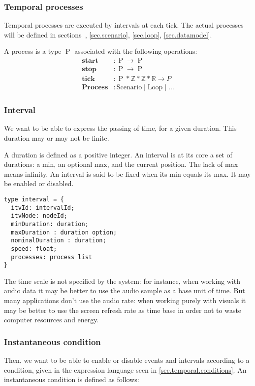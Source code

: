 \documentclass[applsci,article,submit,moreauthors,pdftex,10pt,a4paper]{mdpi}
\DeclareMathOperator{\proc}{P}
\begin{document}
\subsubsection{Temporal processes}
Temporal processes are executed by intervals at each tick. 
The actual processes will be defined in sections~, \ref{sec.scenario}, \ref{sec.loop}, \ref{sec.datamodel}.

A process is a type $\proc$ associated with the following operations: 
\begin{align*}
\mathbf{start}&: \proc \rightarrow \proc \\
\mathbf{stop}&: \proc \rightarrow \proc \\
\mathbf{tick}&: \proc * \mathbb{Z} * \mathbb{Z} * \mathbb{R} \rightarrow P\\
\mathbf{Process}&: \mathrm{Scenario} \mid \mathrm{Loop} \mid  \dots
\end{align*}
\subsubsection{Interval}
We want to be able to express the passing of time, for a given duration.
This duration may or may not be finite.

A duration is defined as a positive integer.
An interval is at its core a set of durations: a min, an optional max, and the current position. 
The lack of max means infinity.
An interval is said to be fixed when its min equals its max. It may be enabled or disabled.

\begin{lstlisting}
type interval = {
  itvId: intervalId;
  itvNode: nodeId;
  minDuration: duration;
  maxDuration : duration option;
  nominalDuration : duration;
  speed: float;
  processes: process list
}
\end{lstlisting}

The time scale is not specified by the system: for instance, when working with audio data it may be better to use the audio sample as a base unit of time.
But many applications don't use the audio rate: when working purely with visuals it may be better to use the screen refresh rate as time base in order not to 
waste computer resources and energy. 

\subsubsection{Instantaneous condition}
Then, we want to be able to enable or disable events and intervals according to a condition, given in the expression language seen in \ref{sec.temporal.conditions}. An instantaneous condition is defined as follows: 
\end{document}

